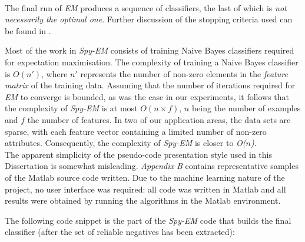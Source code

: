 \documentclass[12pt,twoside,notitlepage,amsart]{report} %
\begin{document}
	\\
	
	The final run of \emph{EM} produces a sequence of classifiers, the last of which is \emph{not necessarily the optimal one}. Further discussion of the stopping criteria used can be found in \cite{Liu02}.
	 
	Most of the work in \emph{Spy-EM} consists of training Naive Bayes classifiers required for expectation maximisation. The complexity of training a Naive Bayes classifier is $O(n')$, where $n'$ represents the number of non-zero elements in the \emph{feature matrix} of the training data. Assuming that the number of iterations required for \emph{EM} to converge is bounded, as was the case in our experiments, it follows that the complexity of \emph{Spy-EM} is at most $O(n \times f)$, $n$ being the number of examples and $f$ the number of features. In two of our application areas, the data sets are sparse, with each feature vector containing a limited number of non-zero attributes. Consequently, the complexity of \emph{Spy-EM} is closer to \emph{O($n$)}. \\

The apparent simplicity of the pseudo-code presentation style used in this Dissertation is somewhat misleading. \emph{Appendix B} contains representative samples of the Matlab source code written. Due to the machine learning nature of the project, no user interface was required: all code was written in Matlab and all results were obtained by running the algorithms in the Matlab environment. 

The following code snippet is the part of the \emph{Spy-EM} code that builds the final classifier (after the set of reliable negatives has been extracted):

\lstset{linewidth=16cm}
\end{document}

